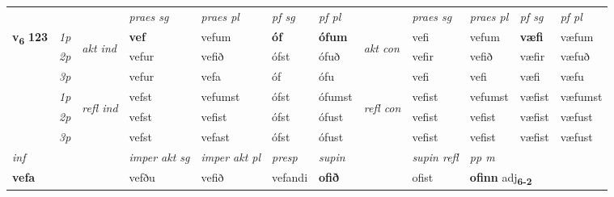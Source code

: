\begin{longtable}[l]{X>{\footnotesize\itshape}llXXXXlXXXX}
 & &   & \textit{praes sg}  & \textit{praes pl}    & \textit{ pf sg} & \textit{pf pl} & & \textit{praes sg}  & \textit{praes pl}    & \textit{pf sg} & \textit{pf pl }  \\ \cmidrule{4-7} \cmidrule{9-12}
 \multirow{2}{*}{{{\textbf{v{\textsubscript{6}}} \Large{\textbf{123}}}}}  & 1p & \multirow{3}{*}{\begin{turn}{90}\textit{akt ind}\end{turn}} & \textbf{vef} & vefum & \textbf{óf} & \textbf{ófum} & \multirow{3}{*}{\begin{turn}{90}\textit{akt con}\end{turn}} &vefi & vefum & \textbf{væfi} & væfum\\*
 & 2p &  &  vefur  & vefið & ófst & ófuð & & vefir & vefið & væfir & væfuð \\*
 & 3p &  & vefur & vefa & óf & ófu & & vefi & vefi& væfi & væfu \\*
\cmidrule{4-7} \cmidrule{9-12}
 & 1p & \multirow{3}{*}{\begin{turn}{90}\textit{refl ind}\end{turn}}  & vefst & vefumst & ófst & ófumst & \multirow{3}{*}{\begin{turn}{90}\textit{refl con}\end{turn}}  &vefist & vefumst & væfist & væfumst \\*
 & 2p &  & vefst & vefist & ófst & ófust & &vefist & vefist & væfist & væfust \\*
 & 3p  & & vefst & vefast & ófst & ófust & & vefist & vefist& væfist & væfust \\*
\cmidrule{4-7} \cmidrule{9-12}

   {\textit{inf}} & &  & \textit{imper akt sg} & \textit{imper akt pl}   & \textit{presp} & \textit{supin} && \textit{supin refl} & \textit{pp m} \\*
  {\textbf{vefa}} & && vefðu  & vefið   & vefandi &  \textbf{ofið} && ofist & \multicolumn{2}{l}{\textbf{ofinn} adj\textbf{\textsubscript{6-2}}} \\*

\midrule


\end{longtable}
